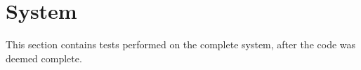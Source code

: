 \section{System}
This section contains tests performed on the complete system, after the code was deemed complete. 